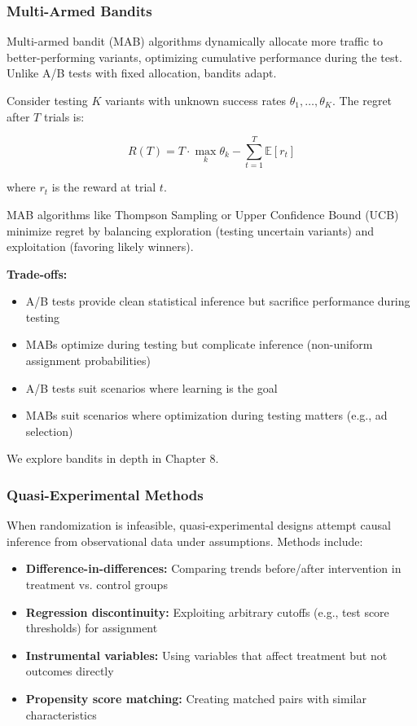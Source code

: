 \subsubsection{Multi-Armed Bandits}

Multi-armed bandit (MAB) algorithms dynamically allocate more traffic to better-performing variants, optimizing cumulative performance during the test. Unlike A/B tests with fixed allocation, bandits adapt.

Consider testing $K$ variants with unknown success rates $\theta_1, \ldots, \theta_K$. The regret after $T$ trials is:

\begin{equation}
R(T) = T \cdot \max_k \theta_k - \sum_{t=1}^T \mathbb{E}[r_t]
\end{equation}

where $r_t$ is the reward at trial $t$.

MAB algorithms like Thompson Sampling or Upper Confidence Bound (UCB) minimize regret by balancing exploration (testing uncertain variants) and exploitation (favoring likely winners).

\textbf{Trade-offs:}
\begin{itemize}
    \item A/B tests provide clean statistical inference but sacrifice performance during testing
    \item MABs optimize during testing but complicate inference (non-uniform assignment probabilities)
    \item A/B tests suit scenarios where learning is the goal
    \item MABs suit scenarios where optimization during testing matters (e.g., ad selection)
\end{itemize}

We explore bandits in depth in Chapter 8.

\subsubsection{Quasi-Experimental Methods}

When randomization is infeasible, quasi-experimental designs attempt causal inference from observational data under assumptions. Methods include:

\begin{itemize}
    \item \textbf{Difference-in-differences:} Comparing trends before/after intervention in treatment vs. control groups
    \item \textbf{Regression discontinuity:} Exploiting arbitrary cutoffs (e.g., test score thresholds) for assignment
    \item \textbf{Instrumental variables:} Using variables that affect treatment but not outcomes directly
    \item \textbf{Propensity score matching:} Creating matched pairs with similar characteristics
\end{itemize}

